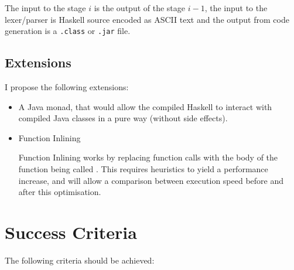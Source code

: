 \documentclass[a4paper,12pt]{article}
\begin{document}
  The input to the stage $i$ is the output of the stage $i-1$, the input to the lexer/parser is Haskell source encoded as ASCII text and the 
  output from code generation is a \texttt{.class} or \texttt{.jar} file.

  \subsection*{Extensions}

  I propose the following extensions:

  \begin{itemize}
    \item A Java monad, that would allow the compiled Haskell to interact with compiled Java classes in a pure way (without side effects).

    \item Function Inlining

      Function Inlining works by replacing function calls with the body of the function being called \cite{ghc-inliner}.  
      This requires heuristics to yield a performance increase, and will allow a comparison between execution speed before and after this optimisation.
  \end{itemize}

  \section*{Success Criteria}

  The following criteria should be achieved:
\end{document}
